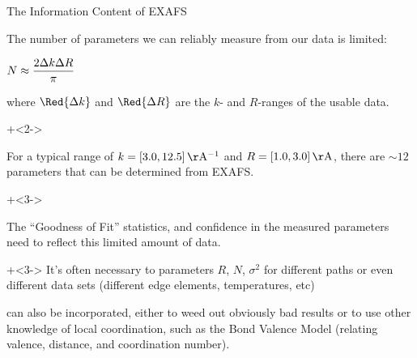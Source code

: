 \begin{slide}{The Information Content of EXAFS}
    
    The number of parameters we can reliably measure from our data is
    limited:
    \vspace{1mm} 

    \begin{center} 
      $\displaystyle  N \approx { { 2 \Delta k \Delta R} \over{ \pi}}  $
    \end{center}
    
    \vspace{1mm} 
    
    where $\Red{ \Delta k}$ and $\Red{ \Delta R}$ are the $k$- and
    $R$-ranges of the usable data.  

    \onslide+<2->
    
    For a typical range of $k = [3.0, 12.5] \rm\,\AA^{-1}$ and $R = [1.0,
    3.0] \rm\,\AA$, there are $\sim 12$ parameters that can be determined
    from EXAFS.

    \onslide+<3->
    \vspace{2mm}

    The ``Goodness of Fit'' statistics, and confidence in the measured
    parameters need to reflect this limited amount of data.

    \vspace{3mm}
    
    \onslide+<3->
    It's often necessary to {} parameters $R$, $N$,
    $\sigma^2$ for different paths or even different data sets (different
    edge elements, temperatures, etc)

    \vspace{2mm}
    
    {} can also be incorporated, either to weed
    out obviously bad results or to use other knowledge of local
    coordination, such as the Bond Valence Model (relating valence,
    distance, and coordination number).
    
    \vspace{3mm}
 
    \begin{center}
      {}
      \end{center}
          
\vfill
\end{slide} 
